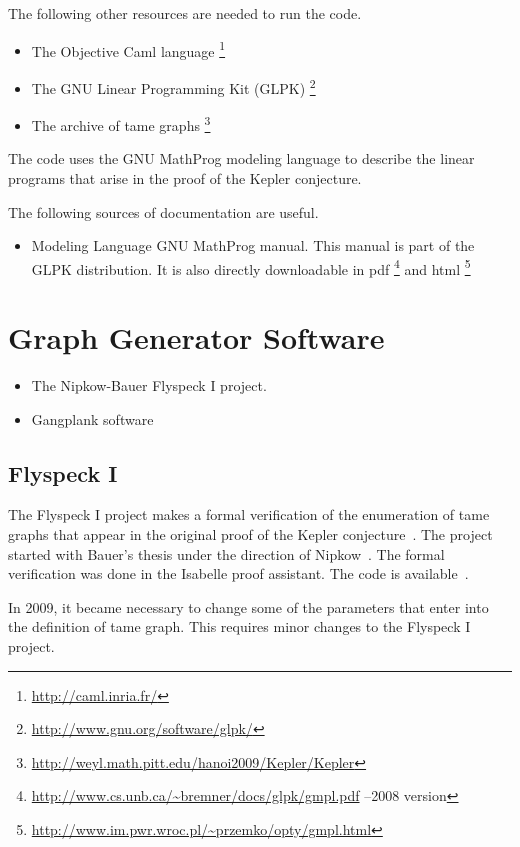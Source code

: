 The following other resources are needed to run the code.

\begin{itemize}
\item The Objective Caml language%
\footnote{\url{http://caml.inria.fr/}} %
\item The GNU Linear Programming Kit (GLPK)%
\footnote{\url{http://www.gnu.org/software/glpk/}} %
\item The archive of tame graphs%
\footnote{\url{http://weyl.math.pitt.edu/hanoi2009/Kepler/Kepler}}
\end{itemize}

The code uses the GNU MathProg modeling language to describe the linear programs that arise in the proof of the Kepler conjecture.

The following sources of documentation are useful.

\begin{itemize}
\item Modeling Language GNU MathProg manual.  This manual is part of the GLPK distribution.  It is also directly downloadable in pdf%
\footnote{\url{http://www.cs.unb.ca/~bremner/docs/glpk/gmpl.pdf} --2008 version} %
 and html%
\footnote{\url{http://www.im.pwr.wroc.pl/~przemko/opty/gmpl.html}} %
\end{itemize}


\chapter{Graph Generator Software}


\begin{itemize}
\item The Nipkow-Bauer Flyspeck I project.
\item Gangplank software
\end{itemize}

\section{Flyspeck I}

The Flyspeck I project makes a formal verification of the enumeration
of tame graphs that appear in the original proof of the Kepler
conjecture~\cite{BauerN-AFP06}.  The project started with Bauer's
thesis under the direction of Nipkow~\cite{Bauer:2006:Thesis}.  The
formal verification was done in the Isabelle proof assistant.  The
code is available~\cite{BauerN-Flyspeck-I-Isabelle}.

In 2009, it became necessary to change some of the parameters that enter into the definition of tame graph.  This requires minor changes to the Flyspeck I project.



